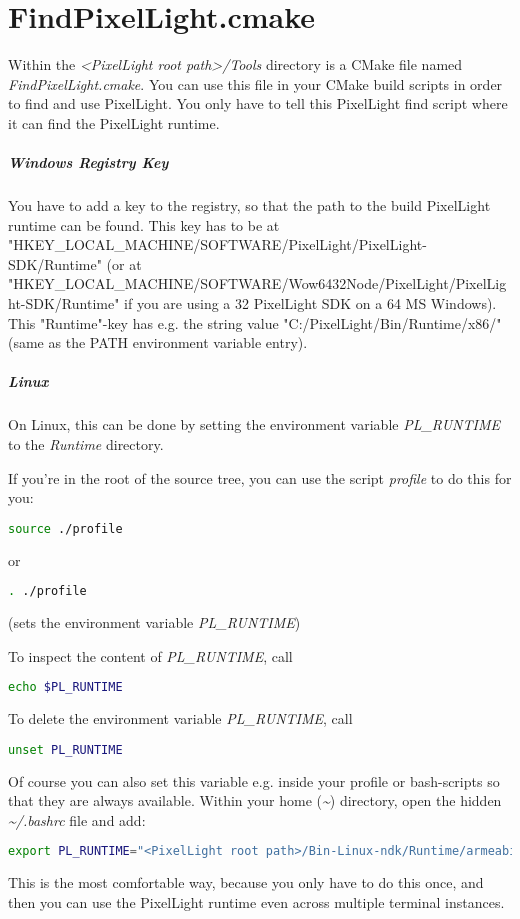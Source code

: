 \chapter{FindPixelLight.cmake}
\label{Appendix:FindPixelLight}
Within the \emph{<PixelLight root path>/Tools} directory is a CMake file named \emph{FindPixelLight.cmake}. You can use this file in your CMake build scripts in order to find and use PixelLight. You only have to tell this PixelLight find script where it can find the PixelLight runtime.


\paragraph{Windows Registry Key}
You have to add a key to the registry, so that the path to the build PixelLight runtime can be found. This key has to be at "HKEY\_LOCAL\_MACHINE/SOFTWARE/PixelLight/PixelLight-SDK/Runtime" (or at "HKEY\_LOCAL\_MACHINE/SOFTWARE/Wow6432Node/PixelLight/PixelLight-SDK/Runtime" if you are using a \SI{32}{\bit} PixelLight SDK on a \SI{64}{\bit} MS Windows). This "Runtime"-key has e.g. the string value "C:/PixelLight/Bin/Runtime/x86/" (same as the PATH environment variable entry).


\paragraph{Linux}
On Linux, this can be done by setting the environment variable \emph{PL\_RUNTIME} to the \emph{Runtime} directory.

If you're in the root of the source tree, you can use the script \emph{profile} to do this for you:
\begin{lstlisting}[language=sh]
source ./profile
\end{lstlisting}
or
\begin{lstlisting}[language=sh]
. ./profile
\end{lstlisting}
(sets the environment variable \emph{PL\_RUNTIME})

To inspect the content of \emph{PL\_RUNTIME}, call
\begin{lstlisting}[language=sh]
echo $PL_RUNTIME
\end{lstlisting}

To delete the environment variable \emph{PL\_RUNTIME}, call
\begin{lstlisting}[language=sh]
unset PL_RUNTIME
\end{lstlisting}

Of course you can also set this variable e.g. inside your profile or bash-scripts so that they are always available. Within your home (\emph{\textasciitilde}) directory, open the hidden \emph{\textasciitilde /.bashrc} file and add:
\begin{lstlisting}[language=sh]
export PL_RUNTIME="<PixelLight root path>/Bin-Linux-ndk/Runtime/armeabi-v7a"
\end{lstlisting}
This is the most comfortable way, because you only have to do this once, and then you can use the PixelLight runtime even across multiple terminal instances.

